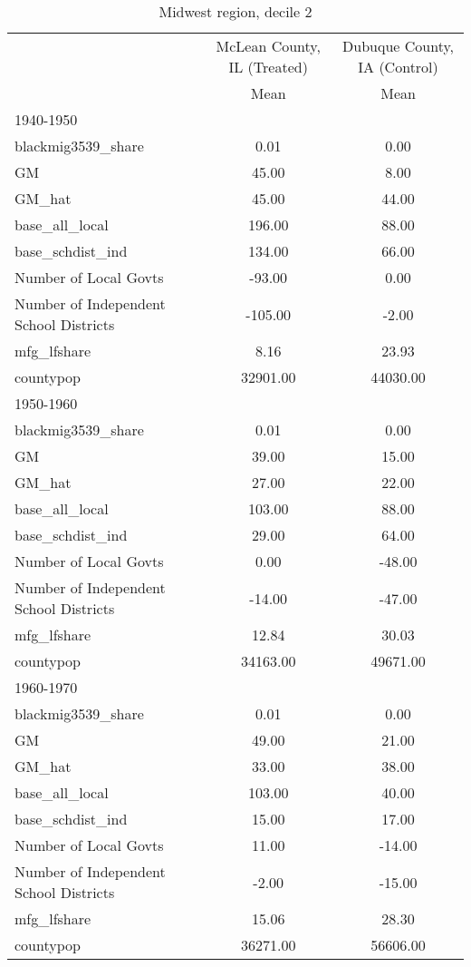\begin{table}[htbp]\centering
\def\sym#1{\ifmmode^{#1}\else\(^{#1}\)\fi}
\caption{Midwest region, decile 2 \label{tab1}}
\begin{tabular}{l*{2}{c}}
\toprule
                    &\multicolumn{1}{c}{McLean County, IL (Treated)}&\multicolumn{1}{c}{Dubuque County, IA (Control)}\\
                    &        Mean&        Mean\\
\midrule
1940-1950           &            &            \\
blackmig3539\_share  &        0.01&        0.00\\
GM                  &       45.00&        8.00\\
GM\_hat              &       45.00&       44.00\\
base\_all\_local      &      196.00&       88.00\\
base\_schdist\_ind    &      134.00&       66.00\\
Number of Local Govts&      -93.00&        0.00\\
Number of Independent School Districts&     -105.00&       -2.00\\
mfg\_lfshare         &        8.16&       23.93\\
countypop           &    32901.00&    44030.00\\
\midrule
1950-1960           &            &            \\
blackmig3539\_share  &        0.01&        0.00\\
GM                  &       39.00&       15.00\\
GM\_hat              &       27.00&       22.00\\
base\_all\_local      &      103.00&       88.00\\
base\_schdist\_ind    &       29.00&       64.00\\
Number of Local Govts&        0.00&      -48.00\\
Number of Independent School Districts&      -14.00&      -47.00\\
mfg\_lfshare         &       12.84&       30.03\\
countypop           &    34163.00&    49671.00\\
\midrule
1960-1970           &            &            \\
blackmig3539\_share  &        0.01&        0.00\\
GM                  &       49.00&       21.00\\
GM\_hat              &       33.00&       38.00\\
base\_all\_local      &      103.00&       40.00\\
base\_schdist\_ind    &       15.00&       17.00\\
Number of Local Govts&       11.00&      -14.00\\
Number of Independent School Districts&       -2.00&      -15.00\\
mfg\_lfshare         &       15.06&       28.30\\
countypop           &    36271.00&    56606.00\\
\bottomrule
\end{tabular}
\end{table}
